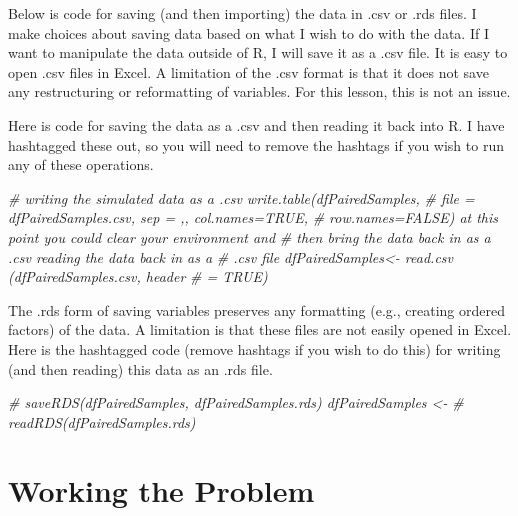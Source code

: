\documentclass[
  11pt,
]{book}
\newenvironment{Shaded}{\begin{snugshade}}{\end{snugshade}}
\newcommand{\CommentTok}[1]{\textcolor[rgb]{0.56,0.35,0.01}{\textit{#1}}}
\begin{document}
Below is code for saving (and then importing) the data in .csv or .rds files. I make choices about saving data based on what I wish to do with the data. If I want to manipulate the data outside of R, I will save it as a .csv file. It is easy to open .csv files in Excel. A limitation of the .csv format is that it does not save any restructuring or reformatting of variables. For this lesson, this is not an issue.

Here is code for saving the data as a .csv and then reading it back into R. I have hashtagged these out, so you will need to remove the hashtags if you wish to run any of these operations.

\begin{Shaded}
\begin{Highlighting}[]
\CommentTok{\# writing the simulated data as a .csv write.table(dfPairedSamples,}
\CommentTok{\# file = \textquotesingle{}dfPairedSamples.csv\textquotesingle{}, sep = \textquotesingle{},\textquotesingle{}, col.names=TRUE,}
\CommentTok{\# row.names=FALSE) at this point you could clear your environment and}
\CommentTok{\# then bring the data back in as a .csv reading the data back in as a}
\CommentTok{\# .csv file dfPairedSamples\textless{}{-} read.csv (\textquotesingle{}dfPairedSamples.csv\textquotesingle{}, header}
\CommentTok{\# = TRUE)}
\end{Highlighting}
\end{Shaded}

The .rds form of saving variables preserves any formatting (e.g., creating ordered factors) of the data. A limitation is that these files are not easily opened in Excel. Here is the hashtagged code (remove hashtags if you wish to do this) for writing (and then reading) this data as an .rds file.

\begin{Shaded}
\begin{Highlighting}[]
\CommentTok{\# saveRDS(dfPairedSamples, \textquotesingle{}dfPairedSamples.rds\textquotesingle{}) dfPairedSamples \textless{}{-}}
\CommentTok{\# readRDS(\textquotesingle{}dfPairedSamples.rds\textquotesingle{})}
\end{Highlighting}
\end{Shaded}

\hypertarget{working-the-problem-2}{%
\section{Working the Problem}\label{working-the-problem-2}}
\end{document}
